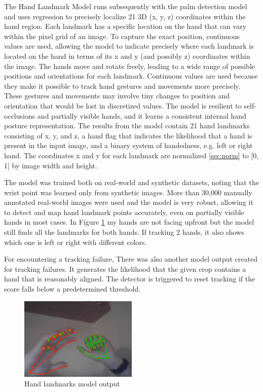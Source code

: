 The Hand Landmark Model runs subsequently with the palm detection model and uses regression to precisely localize 21 3D (x, y, z) coordinates within the hand region. Each landmark has a specific location on the hand that can vary within the pixel grid of an image. To capture the exact position, continuous values are used, allowing the model to indicate precisely where each landmark is located on the hand in terms of its x and y (and possibly z) coordinates within the image. The hands move and rotate freely, leading to a wide range of possible positions and orientations for each landmark. Continuous values are used because they make it possible to track hand gestures and movements more precisely. These gestures and movements may involve tiny changes to position and orientation that would be lost in discretized values.
The model is resilient to self-occlusions and partially visible hands, and it learns a consistent internal hand posture representation. The results from the model contain 21 hand landmarks consisting of x, y, and z, a hand flag that indicates the likelihood that a hand is present in the input image, and a binary system of handedness, e.g. left or right hand.
The coordinates x and y for each landmark are normalized \ref{sec:norm} to [0, 1] by image width and height. 

The model was trained both on real-world and synthetic datasets, noting that the wrist point was learned only from synthetic images. More than 30,000 manually annotated real-world images were used and the model is very robust, allowing it to detect and map hand landmark points accurately, even on partially visible hands in most cases. In Figure
\ref{fig:landmark_both_hands} my hands are not facing upfront but the model still finds all the landmarks for both hands. If tracking 2 hands, it also shows which one is left or right with different colors.

For encountering a tracking failure, There was also another model output created for tracking failures. It generates the likelihood that the given crop contains a hand that is reasonably aligned. The detector is triggered to reset tracking if the score falls below a predetermined threshold.

\begin{figure}
	\centering
	\includegraphics[width = 0.5\textwidth]{images/landmarks_both_hands.png}
	\caption{Hand landmarks model output}
	\label{fig:landmark_both_hands}
\end{figure}

